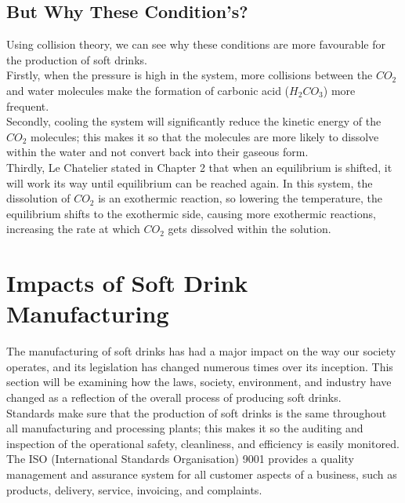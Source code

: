 \section{But Why These Condition's?}
Using collision theory, we can see why these conditions are more favourable for the production of soft drinks. \\

Firstly, when the pressure is high in the system, more collisions between the \begin{math}CO_{2}\end{math} and water molecules make the formation of carbonic acid (\begin{math}H_{2}CO_{3}\end{math}) more frequent. \\

Secondly, cooling the system will significantly reduce the kinetic energy of the \begin{math}CO_{2}\end{math} molecules; this makes it so that the molecules are more likely to dissolve within the water and not convert back into their gaseous form. \\

Thirdly, Le Chatelier stated in Chapter 2 that when an equilibrium is shifted, it will work its way until equilibrium can be reached again. 
In this system, the dissolution of \begin{math}CO_{2}\end{math} is an exothermic reaction, so lowering the temperature, the equilibrium shifts to the exothermic side, causing more exothermic reactions, increasing the rate at which \begin{math}CO_{2}\end{math} gets dissolved within the solution.

\chapter{Impacts of Soft Drink Manufacturing}\label{ch04}

The manufacturing of soft drinks has had a major impact on the way our society operates, and its legislation has changed numerous times over its inception. This section will be examining how the laws, society, environment, and industry have changed as a reflection of the overall process of producing soft drinks. \\

Standards make sure that the production of soft drinks is the same throughout all manufacturing and processing plants; this makes it so the auditing and inspection of the operational safety, cleanliness, and efficiency is easily monitored.
The ISO (International Standards Organisation) 9001 provides a quality management and assurance system for all customer aspects of a business, such as products, delivery, service, invoicing, and complaints. \\

